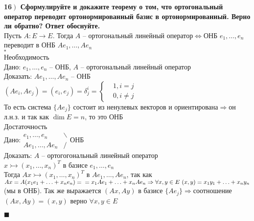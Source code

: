 \documentclass[a4paper,12pt]{article}
\begin{document}
    \textbf{16$\left.\right)$ Сформулируйте и докажите теорему о том, что ортогональный оператор переводит ортонормированный базис в ортонормированный. Верно ли обратно? Ответ обоснуйте.}\\
    Пусть $A:E\rightarrow E$. Тогда $A$ -- ортогональный линейный оператор$\Leftrightarrow$ОНБ $e_1, \ldots, e_n$ переводит в ОНБ $Ae_1, \ldots, Ae_n$\\
    $\square$\\
    Необходимость\\
    Дано: $e_1, \ldots, e_n$ -- ОНБ, $A$ -- ортогональный линейный оператор\\
    Доказать: $Ae_1, \ldots, Ae_n$ -- ОНБ\\
    $(Ae_i, Ae_j)=(e_i, e_j)=\delta_j^i=\left\lbrace \begin{aligned}
                                                         &1, i=j\\
                                                         &0, i\ne j
    \end{aligned}\right. $\\
    То есть система $\{Ae_j \}$ состоит из ненулевых векторов и ориентирована$\Rightarrow$он л.н.з. и так как $\dim E=n$, то это ОНБ\\
    Достаточность\\
    Дано:$\begin{aligned}
              e_1, \ldots, e_n&\backslash\\
              Ae_1, \ldots, Ae_n&/
    \end{aligned}$ОНБ\\
    Доказать: $A$ -- ортогогональный линейный оператор\\
    $x\rightarrowtail(x_1, \ldots, x_n)^T$ в базисе $e_1, \ldots, e_n$\\
    Тогда $Ax\rightarrowtail(x_1, \ldots, x_n)^T$ в $Ae_1, \ldots, Ae_n$, так как $Ax=A(x_1e_1+\ldots+x_ne_n)=\\=x_1Ae_1+\ldots+x_nAe_n\Rightarrow\forall x, y\in E\ (x, y)=x_1y_1+\ldots+x_ny_n$ (мы в ОНБ). Так же выражается $(Ax, Ay)$ в базисе $\{Ae_j \}\Rightarrow$соотношение $(Ax, Ay)=(x, y)$ верно $\forall x, y\in E$
    \begin{flushright}
        $\blacksquare$
    \end{flushright}
\end{document}
